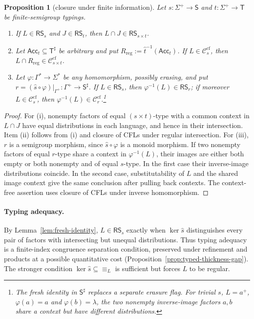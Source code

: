 \documentclass[11pt,a4paper]{article}
\newtheorem{proposition}[theorem]{Proposition}
\theoremstyle{remark}
\theoremstyle{plain}
\newcommand{\cf}{\mathrm{cf}}
\newcommand{\Ccf}[1]{\mathcal C_{#1}^{\cf}}
\begin{document}
\begin{proposition}[closure under finite information]\label{prop:finite-info-closure}
Let $s:\Sigma^+\to\mathsf S$ and
$t:\Sigma^+\to\mathsf T$ be finite-semigroup typings.
\begin{enumerate}[label=\textup{(\roman*)},nosep]
\item If $L\in\mathsf{RS}_s$ and $J\in\mathsf{RS}_t$, then
$L\cap J\in\mathsf{RS}_{s\times t}$.
\item Let $\mathsf{Acc}_t\subseteq\mathsf T^\sharp$ be arbitrary and put
$R_{\mathrm{reg}}:=\widehat t^{-1}(\mathsf{Acc}_t)$.
If $L\in\Ccf{s}$, then
$L\cap R_{\mathrm{reg}}\in\Ccf{s\times t}$.
\item Let $\varphi:\Gamma^*\to\Sigma^*$ be any
homomorphism, possibly erasing, and put
$r=(\widehat s\circ\varphi)|_{\Gamma^+}:
\Gamma^+\to\mathsf S^\sharp$.
If $L\in\mathsf{RS}_s$, then
$\varphi^{-1}(L)\in\mathsf{RS}_r$;
if moreover $L\in\Ccf{s}$, then
$\varphi^{-1}(L)\in\Ccf{r}$.\footnote{%
The fresh identity in $\mathsf S^\sharp$ replaces
a separate erasure flag.  For trivial $s$,
$L=a^+$, $\varphi(a)=a$ and $\varphi(b)=\lambda$,
the two nonempty inverse-image factors $a,b$
share a context but have different distributions.}
\end{enumerate}
\end{proposition}
\begin{proof}
For (i), nonempty factors of equal $(s\times t)$-type
with a common context in $L\cap J$ have equal
distributions in each language, and hence in
their intersection. Item (ii) follows from (i)
and closure of CFLs under regular intersection.
For (iii), $r$ is a semigroup morphism, since
$\widehat s\circ\varphi$ is a monoid morphism.
If two nonempty factors of equal $r$-type share
a context in $\varphi^{-1}(L)$, their images are
either both empty or both nonempty and of equal
$s$-type.  In the first case their inverse-image
distributions coincide.  In the second case,
substitutability of $L$ and the shared image
context give the same conclusion after pulling
back contexts.  The context-free assertion uses
closure of CFLs under inverse homomorphism.
\end{proof}

\paragraph{Typing adequacy.}
By Lemma~\ref{lem:fresh-identity},
$L\in\mathsf{RS}_s$ exactly when $\ker \widehat s$
distinguishes every pair of factors with intersecting but
unequal distributions.  Thus typing adequacy is a
finite-index congruence separation condition, preserved
under refinement and products at a possible quantitative
cost (Proposition~\ref{prop:typed-thickness-gap}).
The stronger condition $\ker \widehat s\subseteq\equiv_L$
is sufficient but forces $L$ to be regular.
\end{document}
